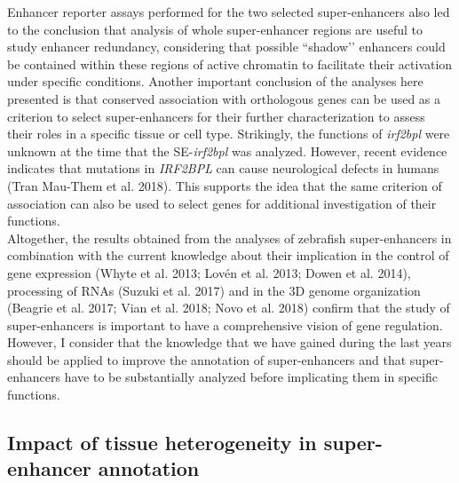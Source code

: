 Enhancer reporter assays performed for the two selected super-enhancers also led to the conclusion that analysis of whole super-enhancer regions are useful to study enhancer redundancy, considering that possible ``shadow’’ enhancers could be contained within these regions of active chromatin to facilitate their activation under specific conditions. Another important conclusion of the analyses here presented is that conserved association with orthologous genes can be used as a criterion to select super-enhancers for their further characterization to assess their roles in a specific tissue or cell type. Strikingly, the functions of \textit{irf2bpl} were unknown at the time that the SE-\textit{irf2bpl} was analyzed. However, recent evidence indicates that mutations in \textit{IRF2BPL} can cause neurological defects in humans (Tran Mau-Them et al. 2018). This supports the idea that the same criterion of association can also be used to select genes for additional investigation of their functions.\\

Altogether, the results obtained from the analyses of zebrafish super-enhancers in combination with the current knowledge about their implication in the control of gene expression (Whyte et al. 2013; Lovén et al. 2013; Dowen et al. 2014), processing of RNAs (Suzuki et al. 2017) and in the 3D genome organization (Beagrie et al. 2017; Vian et al. 2018; Novo et al. 2018) confirm that the study of super-enhancers is important to have a comprehensive vision of gene regulation. However, I consider that the knowledge that we have gained during the last years should be applied to improve the annotation of super-enhancers and that super-enhancers have to be substantially analyzed before implicating them in specific functions.\\

		\subsection{Impact of tissue heterogeneity in super-enhancer annotation}

